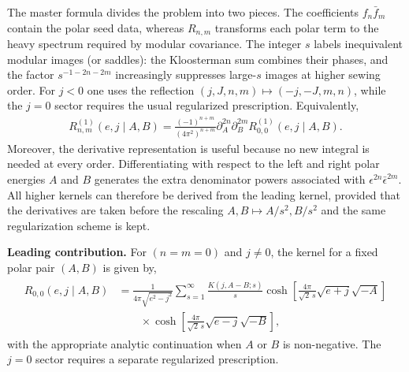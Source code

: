 \documentclass[12 pt]{article}
\begin{document}
The master formula divides the problem into two pieces.  The coefficients $f_n\bar f_m$ contain the polar seed data, whereas $R_{n,m}$ transforms each polar term to the heavy spectrum required by modular covariance.  The integer $s$ labels inequivalent modular images (or saddles): the Kloosterman sum combines their phases, and the factor $s^{-1-2n-2m}$ increasingly suppresses large-$s$ images at higher sewing order.
For \(j<0\) one uses the reflection
\((j,J,n,m)\mapsto(-j,-J,m,n)\), while the \(j=0\) sector requires the usual regularized prescription. Equivalently,
\begin{align}
    R_{n,m}^{(1)}(e,j\mid A,B)
    =
    \frac{(-1)^{n+m}}{(4\pi^2)^{n+m}}
    \partial_A^{2n}\partial_B^{2m}
    R_{0,0}^{(1)}(e,j\mid A,B).
    \label{eq:R-derivative-form}
\end{align}
 Moreover, the derivative representation is useful because no new integral is needed at every order.  Differentiating with respect to the left and right polar energies $A$ and $B$ generates the extra denominator powers associated with $\epsilon^{2n}\bar\epsilon^{2m}$.  All higher kernels can therefore be derived from the leading kernel, provided that the derivatives are taken before the rescaling $A,B\mapsto A/s^2,B/s^2$ and the same regularization scheme is kept.\\ \par


\noindent
\textbf{Leading contribution.} For $(n=m=0)$ and $j\neq0$, the kernel for a fixed polar pair $(A,B)$ is given by,
\begin{align}
\begin{split}
    R_{0,0}(e,j\mid A,B)
    &=
    \frac{1}{4\pi\sqrt{e^2-j^2}}
    \sum_{s=1}^{\infty}
    \frac{K(j,A-B;s)}{s}
    \cosh\!\left[
        \frac{4\pi}{\sqrt{2}\,s}
        \sqrt{e+j}\sqrt{-A}
    \right]\\
    &\qquad\times
    \cosh\!\left[
        \frac{4\pi}{\sqrt{2}\,s}
        \sqrt{e-j}\sqrt{-B}
    \right],
\end{split}
\label{6.26t}
\end{align}
with the appropriate analytic continuation when $A$ or $B$ is non-negative. The $j=0$ sector requires a separate regularized prescription.
\end{document}
